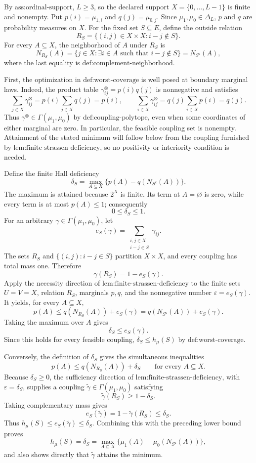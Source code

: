 By \(\text{ass:ordinal-support}\), \(L\geq 3\), so the declared support \(X=\{0,\ldots,L-1\}\) is finite and nonempty.  Put \(p(i)=\mu_{1,i}\) and \(q(j)=\mu_{0,j}\).  Since \(\mu_1,\mu_0\in\Delta_L\), \(p\) and \(q\) are probability measures on \(X\).  For the fixed set \(S\subseteq E\), define the outside relation
\[
R_S=\{(i,j)\in X\times X:i-j\notin S\}.
\]
For every \(A\subseteq X\), the neighborhood of \(A\) under \(R_S\) is
\[
N_{R_S}(A)=\{j\in X:\exists i\in A\text{ such that }i-j\notin S\}
=N_{S^{\mathsf c}}(A),
\]
where the last equality is \(\text{def:complement-neighborhood}\).

First, the optimization in \(\text{def:worst-coverage}\) is well posed at boundary marginal laws.  Indeed, the product table \(\gamma^{\otimes}_{ij}=p(i)q(j)\) is nonnegative and satisfies
\[
\sum_{j\in X}\gamma^{\otimes}_{ij}=p(i)\sum_{j\in X}q(j)=p(i),
\qquad
\sum_{i\in X}\gamma^{\otimes}_{ij}=q(j)\sum_{i\in X}p(i)=q(j).
\]
Thus \(\gamma^{\otimes}\in\Gamma(\mu_1,\mu_0)\) by \(\text{def:coupling-polytope}\), even when some coordinates of either marginal are zero.  In particular, the feasible coupling set is nonempty.  Attainment of the stated minimum will follow below from the coupling furnished by \(\text{lem:finite-strassen-deficiency}\), so no positivity or interiority condition is needed.

Define the finite Hall deficiency
\[
\delta_S=\max_{A\subseteq X}\bigl\{p(A)-q(N_{S^{\mathsf c}}(A))\bigr\}.
\]
The maximum is attained because \(2^X\) is finite.  Its term at \(A=\varnothing\) is zero, while every term is at most \(p(A)\leq1\); consequently
\[
0\leq\delta_S\leq1.
\]
For an arbitrary \(\gamma\in\Gamma(\mu_1,\mu_0)\), let
\[
e_S(\gamma)=\sum_{\substack{i,j\in X\\i-j\in S}}\gamma_{ij}.
\]
The sets \(R_S\) and \(\{(i,j):i-j\in S\}\) partition \(X\times X\), and every coupling has total mass one.  Therefore
\[
\gamma(R_S)=1-e_S(\gamma).
\]
Apply the necessity direction of \(\text{lem:finite-strassen-deficiency}\) to the finite sets \(U=V=X\), relation \(R_S\), marginals \(p,q\), and the nonnegative number \(\varepsilon=e_S(\gamma)\).  It yields, for every \(A\subseteq X\),
\[
p(A)\leq q(N_{R_S}(A))+e_S(\gamma)
=q(N_{S^{\mathsf c}}(A))+e_S(\gamma).
\]
Taking the maximum over \(A\) gives
\[
\delta_S\leq e_S(\gamma).
\]
Since this holds for every feasible coupling, \(\delta_S\leq h_\mu(S)\) by \(\text{def:worst-coverage}\).

Conversely, the definition of \(\delta_S\) gives the simultaneous inequalities
\[
p(A)\leq q(N_{R_S}(A))+\delta_S
\qquad\text{for every }A\subseteq X.
\]
Because \(\delta_S\geq0\), the sufficiency direction of \(\text{lem:finite-strassen-deficiency}\), with \(\varepsilon=\delta_S\), supplies a coupling \(\widetilde\gamma\in\Gamma(\mu_1,\mu_0)\) satisfying
\[
\widetilde\gamma(R_S)\geq1-\delta_S.
\]
Taking complementary mass gives
\[
e_S(\widetilde\gamma)=1-\widetilde\gamma(R_S)\leq\delta_S.
\]
Thus \(h_\mu(S)\leq e_S(\widetilde\gamma)\leq\delta_S\).  Combining this with the preceding lower bound proves
\[
h_\mu(S)=\delta_S
=\max_{A\subseteq X}\{\mu_1(A)-\mu_0(N_{S^{\mathsf c}}(A))\},
\]
and also shows directly that \(\widetilde\gamma\) attains the minimum.


